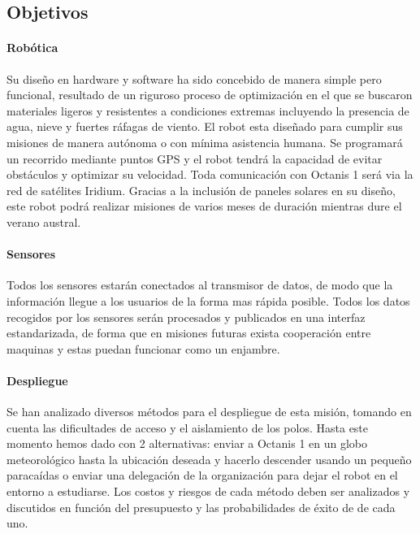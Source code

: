 \documentclass[a4paper,12pt]{article}
\begin{document}
\subsection{Objetivos}



\paragraph{Robótica}
Su diseño en hardware y software ha sido concebido de manera simple pero funcional, resultado de un riguroso proceso de optimización en el que se buscaron materiales ligeros y resistentes a condiciones extremas incluyendo la presencia de agua, nieve y fuertes ráfagas de viento. El robot esta diseñado para cumplir sus misiones de manera autónoma o con mínima asistencia humana. Se programará un recorrido mediante puntos GPS y el robot tendrá la capacidad de evitar obstáculos y optimizar su velocidad. Toda comunicación con Octanis 1 será via la red de satélites Iridium. Gracias a la inclusión de paneles solares en su diseño, este robot podrá realizar misiones de varios meses de duración mientras dure el verano austral.

\paragraph{Sensores}
Todos los sensores estarán conectados al transmisor de datos, de modo que la información llegue a los usuarios de la forma mas rápida posible. Todos los datos recogidos por los sensores serán procesados y publicados en una interfaz estandarizada, de forma que en misiones futuras exista cooperación entre maquinas y estas puedan funcionar como un enjambre. 

\paragraph{Despliegue}
Se han analizado diversos métodos para el despliegue de esta misión, tomando en cuenta las dificultades de acceso y el aislamiento de los polos. Hasta este momento hemos dado con 2 alternativas: enviar a Octanis 1 en un globo meteorológico hasta la ubicación deseada y hacerlo descender usando un pequeño paracaídas o enviar una delegación de la organización para dejar el robot en el entorno a estudiarse. Los costos y riesgos de cada método deben ser analizados y discutidos en función del presupuesto y las probabilidades de éxito de de cada uno.
\end{document}
